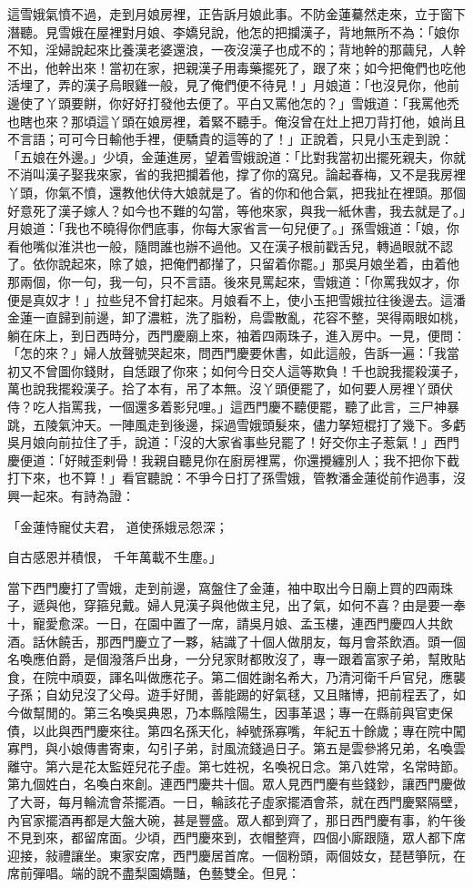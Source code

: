 這雪娥氣憤不過，走到月娘房裡，正告訴月娘此事。不防金蓮驀然走來，立于窗下潛聽。見雪娥在屋裡對月娘、李嬌兒說，他怎的把攔漢子，背地無所不為：「娘你不知，淫婦說起來比養漢老婆還浪，一夜沒漢子也成不的；背地幹的那繭兒，人幹不出，他幹出來！當初在家，把親漢子用毒藥擺死了，跟了來；如今把俺們也吃他活埋了，弄的漢子烏眼雞一般，見了俺們便不待見！」月娘道：「也沒見你，他前邊使了丫頭要餅，你好好打發他去便了。平白又罵他怎的？」雪娥道：「我罵他禿也瞎也來？那頃這丫頭在娘房裡，着緊不聽手。俺沒曾在灶上把刀背打他，娘尚且不言語；可可今日輸他手裡，便驕貴的這等的了！」正說着，只見小玉走到說：「五娘在外邊。」少頃，金蓮進房，望着雪娥說道：「比對我當初出擺死親夫，你就不消叫漢子娶我來家，省的我把攔着他，撑了你的窩兒。論起春梅，又不是我房裡丫頭，你氣不憤，還教他伏侍大娘就是了。省的你和他合氣，把我扯在裡頭。那個好意死了漢子嫁人？如今也不難的勾當，等他來家，與我一紙休書，我去就是了。」月娘道：「我也不曉得你們底事，你每大家省言一句兒便了。」孫雪娥道：「娘，你看他嘴似淮洪也一般，隨問誰也辦不過他。又在漢子根前戳舌兒，轉過眼就不認了。依你說起來，除了娘，把俺們都攆了，只留着你罷。」那吳月娘坐着，由着他那兩個，你一句，我一句，只不言語。後來見罵起來，雪娥道：「你罵我奴才，你便是真奴才！」拉些兒不曾打起來。月娘看不上，使小玉把雪娥拉往後邊去。這潘金蓮一直歸到前邊，卸了濃粧，洗了脂粉，烏雲散亂，花容不整，哭得兩眼如桃，躺在床上，到日西時分，西門慶廟上來，袖着四兩珠子，進入房中。一見，便問：「怎的來？」婦人放聲號哭起來，問西門慶要休書，如此這般，告訴一遍：「我當初又不曾圖你錢財，自恁跟了你來；如何今日交人這等欺負！千也說我擺殺漢子，萬也說我擺殺漢子。拾了本有，吊了本無。沒丫頭便罷了，如何要人房裡丫頭伏侍？吃人指罵我，一個還多着影兒哩。」這西門慶不聽便罷，聽了此言，三尸神暴跳，五陵氣沖天。一陣風走到後邊，採過雪娥頭髮來，儘力拏短棍打了幾下。多虧吳月娘向前拉住了手，說道：「沒的大家省事些兒罷了！好交你主子惹氣！」西門慶便道：「好賊歪剌骨！我親自聽見你在廚房裡罵，你還攪纏別人；我不把你下截打下來，也不算！」看官聽說：不爭今日打了孫雪娥，管教潘金蓮從前作過事，沒興一起來。有詩為證：

「金蓮恃寵仗夫君，  道使孫娥忌怨深；

自古感恩并積恨，  千年萬載不生塵。」

當下西門慶打了雪娥，走到前邊，窩盤住了金蓮，袖中取出今日廟上買的四兩珠子，遞與他，穿箍兒戴。婦人見漢子與他做主兒，出了氣，如何不喜？由是要一奉十，寵愛愈深。一日，在園中置了一席，請吳月娘、孟玉樓，連西門慶四人共飲酒。話休饒舌，那西門慶立了一夥，結識了十個人做朋友，每月會茶飲酒。頭一個名喚應伯爵，是個潑落戶出身，一分兒家財都敗沒了，專一跟着富家子弟，幫敗貼食，在院中頑耍，諢名叫做應花子。第二個姓謝名希大，乃清河衛千戶官兒，應襲子孫；自幼兒沒了父母。遊手好閒，善能踢的好氣毬，又且賭博，把前程丟了，如今做幫閒的。第三名喚吳典恩，乃本縣陰陽生，因事革退；專一在縣前與官吏保債，以此與西門慶來往。第四名孫天化，綽號孫寡嘴，年紀五十餘歲；專在院中闖寡門，與小娘傳書寄柬，勾引子弟，討風流錢過日子。第五是雲參將兄弟，名喚雲離守。第六是花太監姪兒花子虛。第七姓祝，名喚祝日念。第八姓常，名常時節。第九個姓白，名喚白來創。連西門慶共十個。眾人見西門慶有些錢鈔，讓西門慶做了大哥，每月輪流會茶擺酒。一日，輪該花子虛家擺酒會茶，就在西門慶緊隔壁，內官家擺酒再都是大盤大碗，甚是豐盛。眾人都到齊了，那日西門慶有事，約午後不見到來，都留席面。少頃，西門慶來到，衣帽整齊，四個小廝跟隨，眾人都下席迎接，敍禮讓坐。東家安席，西門慶居首席。一個粉頭，兩個妓女，琵琶箏阮，在席前彈唱。端的說不盡梨園嬌豔，色藝雙全。但見：

